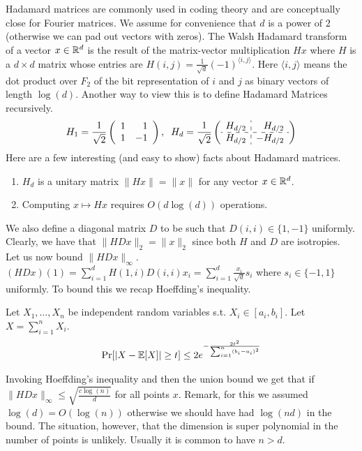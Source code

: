 \documentclass{article}
\begin{document}
Hadamard matrices are commonly used in coding theory and are conceptually
close for Fourier matrices. We assume for convenience that $d$ is a power of $2$ (otherwise we can pad out vectors with zeros).
The Walsh Hadamard transform of a vector $x \in {\mathbb{R}}^{d}$ is the
result of the matrix-vector multiplication $Hx$ where $H$ is a $d
\times d$ matrix whose entries are $H(i,j) = \frac{1}{\sqrt{d}}(-1)^{\langle
i,j\rangle}$. Here ${\langle i,j\rangle}$ means the dot product over
$F_2$ of the bit representation of $i$ and $j$ as binary vectors of
length $\log(d)$.
Another way to view this is to define Hadamard Matrices recursively.
\begin{equation*} %
H_{1} = \frac{1}{\sqrt{2}}\left(
          \begin{array}{rr}
            1 & 1 \\
            1 & -1\\
          \end{array}
        \right)
,\;\;
        H_{d} = \frac{1}{\sqrt{2}}\left(
          \begin{array}{r:r}
            H_{d/2} & H_{d/2} \\ \hdashline
            H_{d/2} & -H_{d/2}\\
          \end{array}
        \right)
\end{equation*} %
Here are a few interesting (and easy to show) facts about Hadamard matrices.
\begin{enumerate}
\item $H_d$ is a unitary matrix $\|Hx\| = \|x\|$ for any vector $x\in {\mathbb{R}}^d$.
\item Computing $x \mapsto Hx$ requires $O(d\log(d))$ operations.
\end{enumerate}


We also define a diagonal matrix $D$ to be such that $D(i,i) \in \{1,-1\}$ uniformly.
Clearly, we have that $\|HDx\|_2 = \|x\|_2$ since both $H$ and $D$ are isotropies.
Let us now bound $\|HDx\|_\infty$.
$(HDx)(1) = \sum_{i=1}^{d}H(1,i)D(i,i) x_i = \sum_{i=1}^{d}\frac{x_i}{\sqrt{d}}s_i$ where $s_i \in \{-1,1\}$ uniformly.
To bound this we recap Hoeffding's inequality.
\begin{fact}
Let $X_1,\ldots,X_n$ be independent random variables s.t. $X_i \in [a_i,b_i]$.
Let $X = \sum_{i=1}^{n} X_i$.
\begin{equation}
\Pr[|X - {\mathbb E}[X]| \ge t] \le 2e^{-\frac{2 t^2}{\sum_{i=1}^{n} (b_i -a_i)^2}}
\end{equation}
\end{fact}
Invoking Hoeffding's inequality and then the union bound we get that if $\|HDx\|_\infty \le \sqrt{\frac{c \log(n)}{d}}$ for all points $x$.
Remark, for this we assumed $\log(d) = O(\log(n))$ otherwise we should have had $\log(nd)$ in the bound. 
The situation, however, that the dimension is super polynomial in the number of points is unlikely. 
Usually it is common to have $n > d$.
\end{document}
